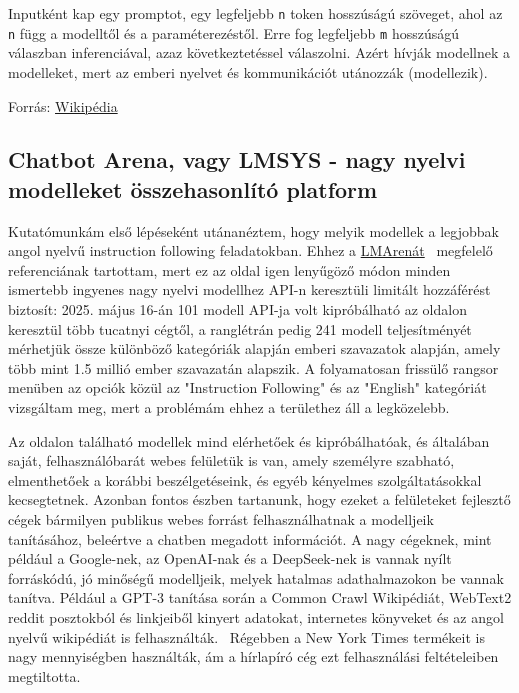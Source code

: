 \documentclass[12pt]{report}
\theoremstyle{definition}
\begin{document}
Inputként kap egy promptot, egy legfeljebb \texttt{n} token hosszúságú szöveget, ahol az \texttt{n} függ a modelltől és a paraméterezéstől. Erre fog legfeljebb \texttt{m} hosszúságú válaszban inferenciával, azaz következtetéssel válaszolni. Azért hívják modellnek a modelleket, mert az emberi nyelvet és kommunikációt utánozzák (modellezik).

Forrás: \href{https://hu.wikipedia.org/wiki/Nagy_nyelvi_modell}{Wikipédia}

\subsection{Chatbot Arena, vagy LMSYS - nagy nyelvi modelleket összehasonlító platform}
Kutatómunkám első lépéseként utánanéztem, hogy melyik modellek a legjobbak angol nyelvű instruction following feladatokban. Ehhez a \href{https://lmarena.ai/}{LMArenát}~\cite{chiang2024chatbot} megfelelő referenciának tartottam, mert ez az oldal igen lenyűgöző módon minden ismertebb ingyenes nagy nyelvi modellhez API-n keresztüli limitált hozzáférést biztosít: 2025. május 16-án 101 modell API-ja volt kipróbálható az oldalon keresztül több tucatnyi cégtől, a ranglétrán pedig 241 modell teljesítményét mérhetjük össze különböző kategóriák alapján emberi szavazatok alapján, amely több mint 1.5 millió ember szavazatán alapszik.
A folyamatosan frissülő rangsor menüben az opciók közül az "Instruction Following" és az "English" kategóriát vizsgáltam meg, mert a problémám ehhez a területhez áll a legközelebb.


Az oldalon található modellek mind elérhetőek és kipróbálhatóak, és általában saját, felhasználóbarát webes felületük is van, amely személyre szabható, elmenthetőek a korábbi beszélgetéseink, és egyéb kényelmes szolgáltatásokkal kecsegtetnek. Azonban fontos észben tartanunk, hogy ezeket a felületeket fejlesztő cégek bármilyen publikus webes forrást felhasználhatnak a modelljeik tanításához, beleértve a chatben megadott információt.
A nagy cégeknek, mint például a Google-nek, az OpenAI-nak és a DeepSeek-nek is vannak nyílt forráskódú, jó minőségű modelljeik, melyek hatalmas adathalmazokon be vannak tanítva. Például a GPT-3 tanítása során a Common Crawl Wikipédiát, WebText2 reddit posztokból és linkjeiből kinyert adatokat, internetes könyveket és az angol nyelvű wikipédiát is felhasználták.~\cite{springboard2023gpt3} Régebben a New York Times termékeit is nagy mennyiségben használták, ám a hírlapíró cég ezt felhasználási feltételeiben megtiltotta.~\cite{verge2023nytai}
\end{document}
